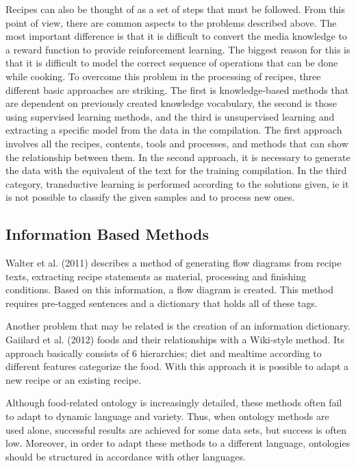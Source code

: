 Recipes can also be thought of as a set of steps that must be followed. From this point of view, there are common aspects to the problems described above. The most important difference is that it is difficult to convert the media knowledge to a reward function to provide reinforcement learning. The biggest reason for this is that it is difficult to model the correct sequence of operations that can be done while cooking. To overcome this problem in the processing of recipes, three different basic approaches are striking. The first is knowledge-based methods that are dependent on previously created knowledge vocabulary, the second is those using supervised learning methods, and the third is unsupervised learning and extracting a specific model from the data in the compilation. The first approach involves all the recipes, contents, tools and processes, and methods that can show the relationship between them. In the second approach, it is necessary to generate the data with the equivalent of the text for the training compilation. In the third category, transductive learning is performed according to the solutions given, ie it is not possible to classify the given samples and to process new ones.

\subsection{Information Based Methods}
Walter et al. (2011) describes a method of generating flow diagrams from recipe texts, extracting recipe statements as material, processing and finishing conditions. Based on this information, a flow diagram is created. This method requires pre-tagged sentences and a dictionary that holds all of these tags.

Another problem that may be related is the creation of an information dictionary. Gaiilard et al. (2012) foods and their relationships with a Wiki-style method. Its approach basically consists of 6 hierarchies; diet and mealtime according to different features categorize the food. With this approach it is possible to adapt a new recipe or an existing recipe.

Although food-related ontology is increasingly detailed, these methods often fail to adapt to dynamic language and variety. Thus, when ontology methods are used alone, successful results are achieved for some data sets, but success is often low. Moreover, in order to adapt these methods to a different language, ontologies should be structured in accordance with other languages.


